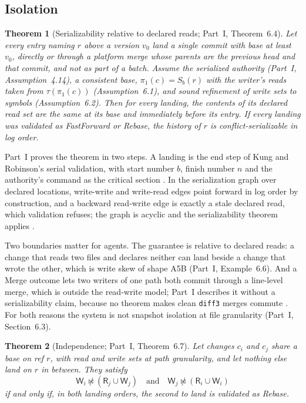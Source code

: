 \documentclass[11pt,letterpaper]{article}
\newtheorem{theorem}{Theorem}[section]
\theoremstyle{definition}
\theoremstyle{remark}
\newcommand{\R}{\mathsf{R}}
\newcommand{\W}{\mathsf{W}}
\newcommand{\Snap}[1]{S_{#1}}
\newcommand{\nmeets}{\not\bowtie}
\newcommand{\tree}{\tau}
\newcommand{\fp}{\pi_1}
\begin{document}
\subsection{Isolation}

\begin{theorem}[Serializability relative to declared reads; Part~I, Theorem~6.4]
\label{thm:syn:ser}
Let every entry naming $r$ above a version $v_0$ land a single commit with base at least $v_0$, directly or through a platform merge whose parents are the previous head and that commit, and not as part of a batch. Assume the serialized authority (Part~I, Assumption~4.14), a consistent base, $\fp(c)=\Snap{b}(r)$ with the writer's reads taken from $\tree(\fp(c))$ (Assumption~6.1), and sound refinement of write sets to symbols (Assumption~6.2). Then for every landing, the contents of its declared read set are the same at its base and immediately before its entry. If every landing was validated as FastForward or Rebase, the history of $r$ is conflict-serializable in log order.
\end{theorem}

Part~I proves the theorem in two steps. A landing is the end step of Kung and Robinson's serial validation, with start number $b$, finish number $n$ and the authority's command as the critical section \cite{kung1981occ}. In the serialization graph over declared locations, write-write and write-read edges point forward in log order by construction, and a backward read-write edge is exactly a stale declared read, which validation refuses; the graph is acyclic and the serializability theorem applies \cite{bhg1987}.

Two boundaries matter for agents. The guarantee is relative to declared reads: a change that reads two files and declares neither can land beside a change that wrote the other, which is write skew of shape A5B (Part~I, Example~6.6). And a Merge outcome lets two writers of one path both commit through a line-level merge, which is outside the read-write model; Part~I describes it without a serializability claim, because no theorem makes clean \texttt{diff3} merges commute \cite{khanna2007diff3}. For both reasons the system is not snapshot isolation at file granularity (Part~I, Section~6.3).

\begin{theorem}[Independence; Part~I, Theorem~6.7]
\label{thm:syn:eq1}
Let changes $c_i$ and $c_j$ share a base on ref $r$, with read and write sets at path granularity, and let nothing else land on $r$ in between. They satisfy
\begin{equation}
\W_i\nmeets(\R_j\cup\W_j)\quad\text{and}\quad\W_j\nmeets(\R_i\cup\W_i)
\label{eq:syn:independent}
\end{equation}
if and only if, in both landing orders, the second to land is validated as Rebase.
\end{theorem}
\end{document}
